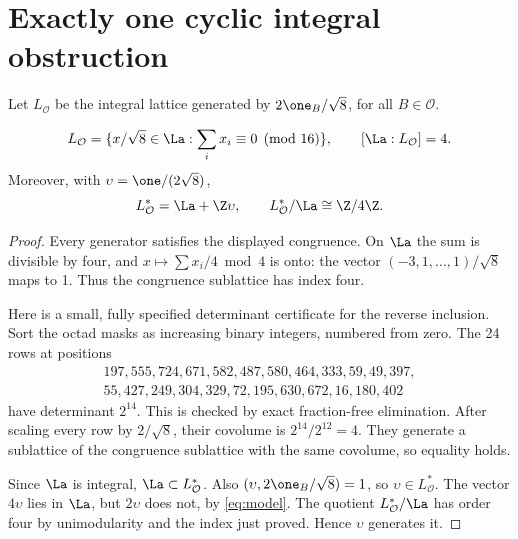 \section{Exactly one cyclic integral obstruction}
Let $L_{\mathcal O}$ be the integral lattice generated by $2\one_B/\sqrt8$, for all $B\in\mathcal O$.
\begin{lemma}\label{lem:indexfour}
\[
L_{\mathcal O}=\{x/\sqrt8\in\La:\sum_i x_i\equiv0\pmod{16}\},\qquad
[\La:L_{\mathcal O}]=4.
\]
Moreover, with $\upsilon=\one/(2\sqrt8)$,
\[
L_{\mathcal O}^*=\La+\Z\upsilon,\qquad
L_{\mathcal O}^*/\La\cong\Z/4\Z.
\]
\end{lemma}
\begin{proof}
Every generator satisfies the displayed congruence. On $\La$ the sum is divisible by four, and $x\mapsto\sum x_i/4\bmod4$ is onto: the vector $(-3,1,\ldots,1)/\sqrt8$ maps to 1. Thus the congruence sublattice has index four.

Here is a small, fully specified determinant certificate for the reverse inclusion. Sort the octad masks as increasing binary integers, numbered from zero. The 24 rows at positions
\[
\begin{gathered}
197,555,724,671,582,487,580,464,333,59,49,397,\\
55,427,249,304,329,72,195,630,672,16,180,402
\end{gathered}
\]
have determinant $2^{14}$. This is checked by exact fraction-free elimination. After scaling every row by $2/\sqrt8$, their covolume is $2^{14}/2^{12}=4$. They generate a sublattice of the congruence sublattice with the same covolume, so equality holds.

Since $\La$ is integral, $\La\subset L_{\mathcal O}^*$. Also $(\upsilon,2\one_B/\sqrt8)=1$, so $\upsilon\in L_{\mathcal O}^*$. The vector $4\upsilon$ lies in $\La$, but $2\upsilon$ does not, by \eqref{eq:model}. The quotient $L_{\mathcal O}^*/\La$ has order four by unimodularity and the index just proved. Hence $\upsilon$ generates it.
\end{proof}

